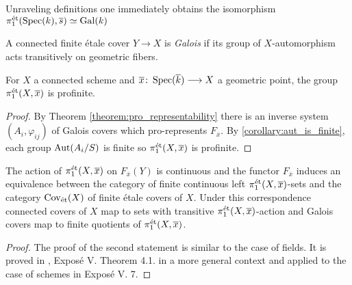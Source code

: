 \begin{remark}
	Unraveling definitions one immediately obtains the isomorphism $\pi^{\text{\'et}}_1(\operatorname{Spec}(k), \overline{s}) \simeq \operatorname{Gal}(k)$
\end{remark}

\begin{definition}
	A connected finite \'etale cover $Y \to X$ is \textit{Galois} if its group of $X$-automorphism acts transitively on geometric fibers.
\end{definition}


\begin{corollary}
	For $X$ a connected scheme and $\overline{x} \colon \operatorname{Spec}(\overline{k}) \longrightarrow X$ a geometric point, the group $\pi^{\text{\'et}}_1(X,\overline{x})$ is profinite.
\end{corollary}

\begin{proof}
	By Theorem \ref{theorem:pro_representability} there is an inverse system $(A_i, \varphi_{ij})$ of Galois covers which pro-represents $F_{\overline{x}}$. By \ref{corollary:aut_is_finite}, each group $\operatorname{Aut}(A_i/S)$ is finite so $\pi^{\text{\'et}}_1(X,\overline{x})$ is profinite.
\end{proof}

\begin{theorem}
	The action of $\pi^{\text{\'et}}_1(X, \overline{x})$ on $F_{\overline{x}}(Y)$ is continuous and the functor $F_{\overline{x}}$ induces an equivalence between the category of finite continuous left $\pi^{\text{\'et}}_1(X, \overline{x})$-sets and the category $\text{Cov}_{\text{\'et}}(X)$ of finite \'etale covers of $X$. Under this correspondence connected covers of $X$ map to sets with transitive $\pi^{\text{\'et}}_1(X, \overline{x})$-action and Galois covers map to finite quotients of $\pi^{\text{\'et}}_1(X, \overline{x})$.
\end{theorem}


\begin{proof}
	The proof of the second statement is similar to the case of fields. It is proved in \cite{SGA1}, Expos\'e V. Theorem 4.1. in a more general context and applied to the case of schemes in Expos\'e V. 7.
\end{proof}

